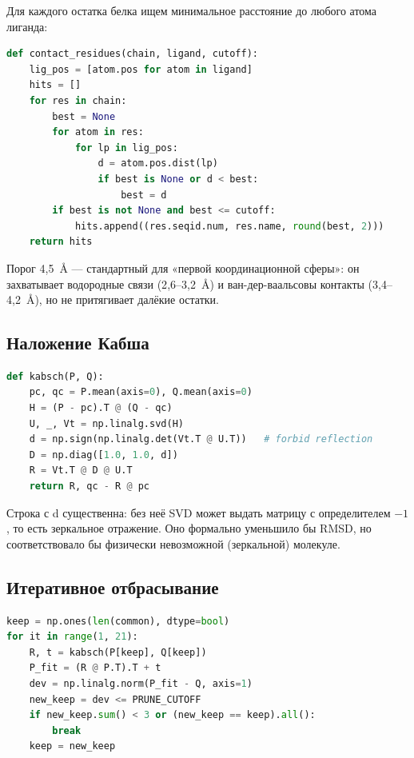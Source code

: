 \documentclass[12pt,a4paper]{article}
\newcommand{\code}[1]{{\ttfamily #1}}
\begin{document}
Для каждого остатка белка ищем минимальное расстояние до любого атома лиганда:

\begin{lstlisting}[language=Python]
def contact_residues(chain, ligand, cutoff):
    lig_pos = [atom.pos for atom in ligand]
    hits = []
    for res in chain:
        best = None
        for atom in res:
            for lp in lig_pos:
                d = atom.pos.dist(lp)
                if best is None or d < best:
                    best = d
        if best is not None and best <= cutoff:
            hits.append((res.seqid.num, res.name, round(best, 2)))
    return hits
\end{lstlisting}

Порог 4{,}5~\AA{} --- стандартный для «первой координационной сферы»: он
захватывает водородные связи (2{,}6--3{,}2~\AA) и ван-дер-ваальсовы контакты
(3{,}4--4{,}2~\AA), но не притягивает далёкие остатки.

\subsection{Наложение Кабша}

\begin{lstlisting}[language=Python]
def kabsch(P, Q):
    pc, qc = P.mean(axis=0), Q.mean(axis=0)
    H = (P - pc).T @ (Q - qc)
    U, _, Vt = np.linalg.svd(H)
    d = np.sign(np.linalg.det(Vt.T @ U.T))   # forbid reflection
    D = np.diag([1.0, 1.0, d])
    R = Vt.T @ D @ U.T
    return R, qc - R @ pc
\end{lstlisting}

Строка с \code{d} существенна: без неё SVD может выдать матрицу с определителем
$-1$, то есть зеркальное отражение. Оно формально уменьшило бы RMSD, но
соответствовало бы физически невозможной (зеркальной) молекуле.

\subsection{Итеративное отбрасывание}

\begin{lstlisting}[language=Python]
keep = np.ones(len(common), dtype=bool)
for it in range(1, 21):
    R, t = kabsch(P[keep], Q[keep])
    P_fit = (R @ P.T).T + t
    dev = np.linalg.norm(P_fit - Q, axis=1)
    new_keep = dev <= PRUNE_CUTOFF
    if new_keep.sum() < 3 or (new_keep == keep).all():
        break
    keep = new_keep
\end{lstlisting}
\end{document}
